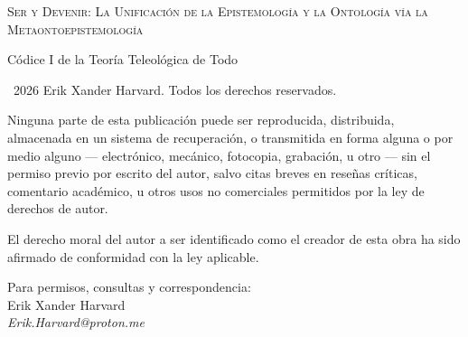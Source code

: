 \documentclass[10pt, openany, oneside]{book}
\renewcommand{\small}{\fontsize{9}{11.5}\selectfont}
\begin{document}

\thispagestyle{empty}
\vspace*{\fill}

\begin{center}

{\scshape Ser y Devenir: La Unificación de la Epistemología y la Ontología vía la Metaontoepistemología}

\vspace{1em}

{\small Códice I de la Teoría Teleológica de Todo}

\end{center}

\vspace{1.5em}

{\small
\noindent \textcopyright\ 2026 Erik Xander Harvard. Todos los derechos reservados.

\vspace{0.8em}

\noindent Ninguna parte de esta publicación puede ser reproducida, distribuida, almacenada en un sistema de recuperación, o transmitida en forma alguna o por medio alguno --- electrónico, mecánico, fotocopia, grabación, u otro --- sin el permiso previo por escrito del autor, salvo citas breves en reseñas críticas, comentario académico, u otros usos no comerciales permitidos por la ley de derechos de autor.

\vspace{0.8em}

\noindent El derecho moral del autor a ser identificado como el creador de esta obra ha sido afirmado de conformidad con la ley aplicable.

\vspace{0.8em}

\noindent Para permisos, consultas y correspondencia:\\
Erik Xander Harvard\\
\textit{Erik.Harvard@proton.me}
}

\vspace{1.5em}
\end{document}
